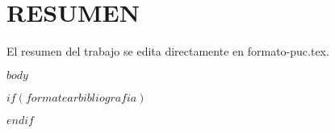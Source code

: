 \documentclass[12pt,reqno,oneside,pdftex]{puctesis} %
\begin{document}



\chapter*{RESUMEN}

El resumen del trabajo se edita directamente en formato-puc.tex.

\cleardoublepage %



\NoChapterPageNumber           %


$body$




$if(formatearbibliografia)$
\cleardoublepage
\nocite{*} %
 

$endif$







\end{document}
